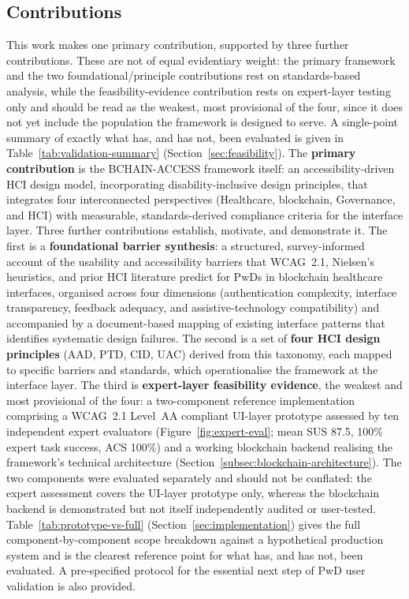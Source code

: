 \documentclass[journal,onecolumn]{IEEEtran}
\begin{document}
\subsection{Contributions}
This work makes one primary contribution, supported by three further contributions. These are not of equal evidentiary weight: the primary framework and the two foundational/principle contributions rest on standards-based analysis, while the feasibility-evidence contribution rests on expert-layer testing only and should be read as the weakest, most provisional of the four, since it does not yet include the population the framework is designed to serve. A single-point summary of exactly what has, and has not, been evaluated is given in Table~\ref{tab:validation-summary} (Section~\ref{sec:feasibility}).
The \textbf{primary contribution} is the BCHAIN-ACCESS framework itself: an accessibility-driven HCI design model, incorporating disability-inclusive design principles, that integrates four interconnected perspectives (Healthcare, blockchain, Governance, and HCI) with measurable, standards-derived compliance criteria for the interface layer. Three further contributions establish, motivate, and demonstrate it. The first is a \textbf{foundational barrier synthesis}: a structured, survey-informed account of the usability and accessibility barriers that WCAG~2.1, Nielsen's heuristics, and prior HCI literature predict for PwDs in blockchain healthcare interfaces, organised across four dimensions (authentication complexity, interface transparency, feedback adequacy, and assistive-technology compatibility) and accompanied by a document-based mapping of existing interface patterns that identifies systematic design failures. The second is a set of \textbf{four HCI design principles} (AAD, PTD, CID, UAC) derived from this taxonomy, each mapped to specific barriers and standards, which operationalise the framework at the interface layer. The third is \textbf{expert-layer feasibility evidence}, the weakest and most provisional of the four: a two-component reference implementation comprising a WCAG~2.1 Level~AA compliant UI-layer prototype assessed by ten independent expert evaluators (Figure~\ref{fig:expert-eval}; mean SUS 87.5, 100\% expert task success, ACS 100\%) and a working blockchain backend realising the framework's technical architecture (Section~\ref{subsec:blockchain-architecture}). The two components were evaluated separately and should not be conflated: the expert assessment covers the UI-layer prototype only, whereas the blockchain backend is demonstrated but not itself independently audited or user-tested. Table~\ref{tab:prototype-vs-full} (Section~\ref{sec:implementation}) gives the full component-by-component scope breakdown against a hypothetical production system and is the clearest reference point for what has, and has not, been evaluated. A pre-specified protocol for the essential next step of PwD user validation is also provided.
\end{document}
